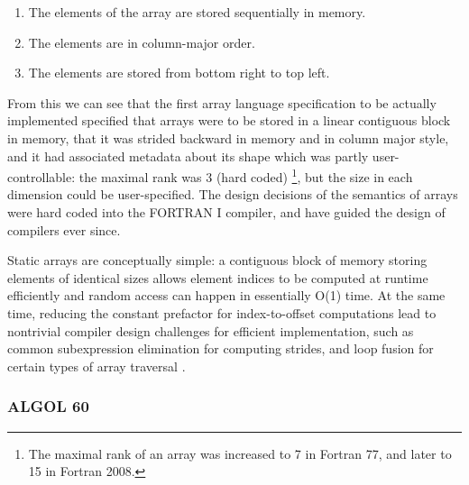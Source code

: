 \documentclass[preprint]{sigplanconf}
\begin{document}

\begin{enumerate}
\item The elements of the array are stored sequentially in memory.
\item The elements are in column-major order.
\item The elements are stored from bottom right to top left.
\end{enumerate}

From this we can see that the first array language specification to be
actually implemented specified that arrays were to be stored in a linear
contiguous block in memory, that it was strided backward in memory and in
column major style, and it had associated metadata about its shape which was
partly user-controllable: the maximal rank was 3 (hard coded) \footnote{The
maximal rank of an array was increased to 7 in Fortran 77, and later to 15 in
Fortran 2008.}, but the size in each dimension could be user-specified. The
design decisions of the semantics of arrays were hard coded into the FORTRAN I
compiler, and have guided the design of compilers ever since.


Static arrays are conceptually simple: a contiguous block of memory storing
elements of identical sizes allows element indices to be computed at runtime
efficiently and random access can happen in essentially O(1) time. At the same
time, reducing the constant prefactor for index-to-offset computations lead to
nontrivial compiler design challenges for efficient implementation, such as
common subexpression elimination for computing strides, and loop fusion for
certain types of array traversal \cite{Busam:1969oe}.


\subsubsection{ALGOL 60}
\end{document}
